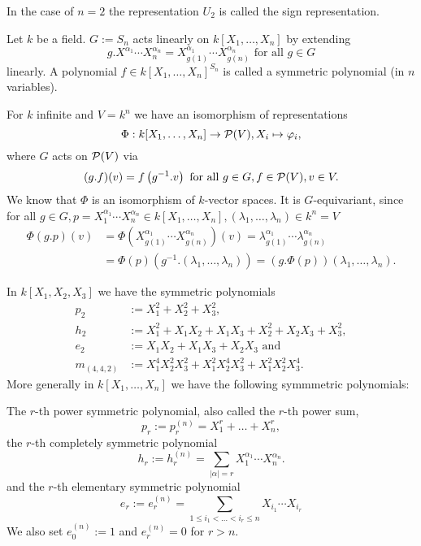 \begin{rem}
 In the case of $n = 2$ the representation $U_2$ is called the sign representation.
\end{rem}


\begin{defi}
 Let $k$ be a field. $G := S_n$ acts linearly on $k[X_1, \ldots, X_n]$ by extending
 \[
  g.X^{\alpha_1} \cdots X_n^{\alpha_n} = X_{g(1)}^{\alpha_1} \cdots X_{g(n)}^{\alpha_n} \text{ for all } g \in G
 \]
 linearly. A polynomial $f \in k[X_1, \ldots, X_n]^{S_n}$ is called a symmetric polynomial (in $n$ variables).
\end{defi}


\begin{rem}
 For $k$ infinite and $V = k^n$ we have an isomorphism of representations
 \[
  \Phi : k[X_1, \ldots, X_n] \to \mathcal{P}(V), X_i \mapsto \varphi_i,
 \]
 where $G$ acts on $\mathcal{P}(V)$ via
 \[
  (g.f)(v) = f\left( g^{-1}.v \right) \text{ for all } g \in G, f \in \mathcal{P}(V), v \in V.
 \]
 We know that $\Phi$ is an isomorphism of $k$-vector spaces. It is $G$-equivariant, since for all $g \in G, p = X_1^{\alpha_1} \cdots X_n^{\alpha_n} \in k[X_1, \ldots, X_n], (\lambda_1, \ldots, \lambda_n) \in k^n = V$
 \begin{align*}
  \Phi(g.p)(v)
  &= \Phi\left( X_{g(1)}^{\alpha_1} \cdots X_{g(n)}^{\alpha_n} \right)(v)
  = \lambda_{g(1)}^{\alpha_1} \cdots \lambda_{g(n)}^{\alpha_n} \\
  &= \Phi(p)\left( g^{-1}.(\lambda_1, \ldots, \lambda_n) \right)
  = (g.\Phi(p))(\lambda_1, \ldots, \lambda_n).
 \end{align*}
\end{rem}


\begin{expl}
 In $k[X_1, X_2, X_3]$ we have the symmetric polynomials
 \begin{align*}
  p_2 &:= X_1^2 + X_2^2 + X_3^2, \\
  h_2 &:= X_1^2 + X_1 X_2 + X_1 X_3 + X_2^2 + X_2 X_3 + X_3^2, \\
  e_2 &:= X_1 X_2 + X_1 X_3 + X_2 X_3 \text{ and} \\
  m_{(4,4,2)} &:= X_1^4 X_2^2 X_3^2 + X_1^2 X_2^4 X_3^2 + X_1^2 X_2^2 X_3^4.
 \end{align*}
 More generally in $k[X_1, \ldots, X_n]$ we have the following symmmetric polynomials:

 The $r$-th power symmetric polynomial, also called the $r$-th power sum,
 \[
  p_r := p_r^{(n)} = X_1^r + \ldots + X_n^r,
 \]
 the $r$-th completely symmetric polynomial
 \[
  h_r := h_r^{(n)} = \sum_{|\alpha|=r} X_1^{\alpha_1} \cdots X_n^{\alpha_n}.
 \]
 and the $r$-th elementary symmetric polynomial
 \[
  e_r := e_r^{(n)} = \sum_{1 \leq i_1 < \ldots < i_r \leq n} X_{i_1} \cdots X_{i_r}
 \]
 We also set $e_0^{(n)} := 1$ and $e_r^{(n)} = 0$ for $r > n$.
\end{expl}


